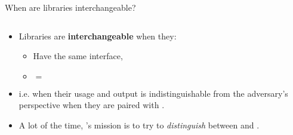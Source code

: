 \documentclass[aspectratio=169, lualatex, handout]{beamer}
\begin{document}
\begin{frame}{When are libraries interchangeable?}
	\begin{columns}[c]
		\begin{column}{0.55\textwidth}
			\begin{itemize}[<+->]
				\item Libraries are \textbf{interchangeable} when they:
				      \begin{itemize}[<+->]
					      \item Have the same interface,
					      \item {} $=$ 
				      \end{itemize}
				\item i.e. when their usage and output is indistinguishable from the adversary's perspective when they are paired with \prog{}.
				\item A lot of the time, \prog{}'s mission is to try to \textit{distinguish} between  and .
			\end{itemize}
		\end{column}
		\begin{column}{0.45\textwidth}
			\begin{flushright}
			\end{flushright}
		\end{column}
	\end{columns}
\end{frame}
\end{document}
